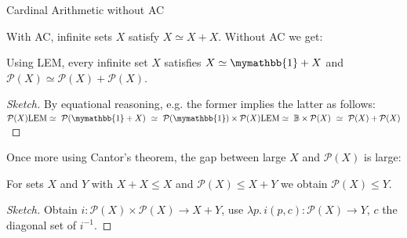\documentclass[xcolor=dvipsnames,compress,aspectratio=169,handout]{beamer}
\newcommand{\MBB}[1]{\ensuremath{\mathbb{#1}}\xspace}  %
\newcommand{\MCL}[1]{\ensuremath{\mathcal{#1}}\xspace} %
\newcommand{\Bool}{\MBB{B}}  %
\newcommand{\Unit}{\mymathbb{1}}  %
\newcommand{\Pow}{\MCL P}
\begin{document}
\begin{frame}{Cardinal Arithmetic without AC}

With AC, infinite sets $X$ satisfy $X\simeq X+X$.
\pause
Without AC we get:

\begin{lemma}
	Using LEM, every infinite set $X$ satisfies $X\simeq\Unit+X$ and $\Pow(X)\simeq\Pow(X)+\Pow(X)$.
\end{lemma}
\vspace{-0.1cm}
\pause
\begin{proof}[Sketch]
	By equational reasoning, e.g. the former implies the latter as follows:
	$\Pow(X)\overset~{\textnormal{LEM}}\simeq~\Pow(\Unit+X)~\simeq~\Pow(\Unit)\times \Pow (X)\overset~{\textnormal{LEM}}\simeq~\Bool\times \Pow(X)~\simeq~ \Pow(X)+\Pow(X)$
\end{proof}

\pause
\vspace{0.3cm}
Once more using Cantor's theorem, the gap between large $X$ and $\Pow(X)$ is large:
\begin{lemma}
	For sets $X$ and $Y$ with $X+X\le X$ and $\Pow (X)\le X+Y$ we obtain $\Pow (X)\le Y$.
\end{lemma}
\pause
\vspace{-0.1cm}
\begin{proof}[Sketch]
	Obtain $i:\Pow (X)\times\Pow (X)\to X+Y$, use $\lambda p.\, i(p,c):\Pow (X)\to Y$, $c$ the diagonal set of $i^{-1}$.
\end{proof}

\end{frame}
\end{document}
